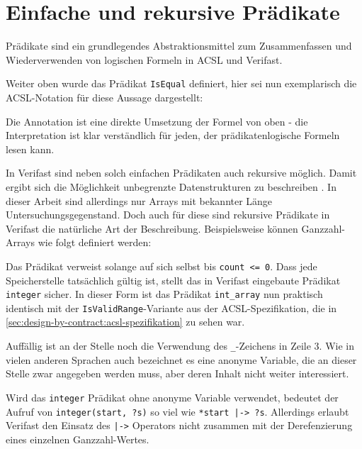 \section{Einfache und rekursive Prädikate}
\label{sec:design-by-contract:predicates}

Prädikate sind ein grundlegendes Abstraktionsmittel zum Zusammenfassen und Wiederverwenden von logischen 
Formeln in ACSL und Verifast.

Weiter oben wurde das Prädikat \lstinline{IsEqual} definiert, hier sei nun exemplarisch die ACSL-Notation
für diese Aussage dargestellt:



Die Annotation ist eine direkte Umsetzung der Formel von oben - die Interpretation ist klar verständlich für 
jeden, der prädikatenlogische Formeln lesen kann.

In Verifast sind neben solch einfachen Prädikaten auch rekursive möglich. Damit ergibt sich die Möglichkeit
unbegrenzte Datenstrukturen zu beschreiben . In dieser
Arbeit sind allerdings nur Arrays mit bekannter Länge Untersuchungsgegenstand. Doch auch für diese sind
rekursive Prädikate in Verifast die natürliche Art der Beschreibung. Beispielsweise können Ganzzahl-Arrays
wie folgt definiert werden:


 
Das Prädikat verweist solange auf sich selbst bis \lstinline{count <= 0}. Dass jede Speicherstelle tatsächlich
gültig ist, stellt das in Verifast eingebaute Prädikat \lstinline{integer} sicher. In dieser Form ist das Prädikat
\lstinline{int_array} nun praktisch identisch mit der \lstinline{IsValidRange}-Variante aus der ACSL-Spezifikation, 
die in \ref{sec:design-by-contract:acsl-spezifikation} zu sehen war.

Auffällig ist an der Stelle noch die Verwendung des \lstinline{_}-Zeichens in Zeile 3. Wie in vielen anderen 
Sprachen auch bezeichnet es eine anonyme Variable, die an dieser Stelle zwar angegeben werden muss, aber deren 
Inhalt nicht weiter interessiert. 

Wird das \lstinline{integer} Prädikat ohne anonyme Variable verwendet, bedeutet der Aufruf von 
\lstinline{integer(start, ?s)} so viel wie \lstinline{*start |-> ?s}. Allerdings erlaubt Verifast
den Einsatz des \lstinline{|->} Operators nicht zusammen mit der Derefenzierung eines einzelnen
Ganzzahl-Wertes.

